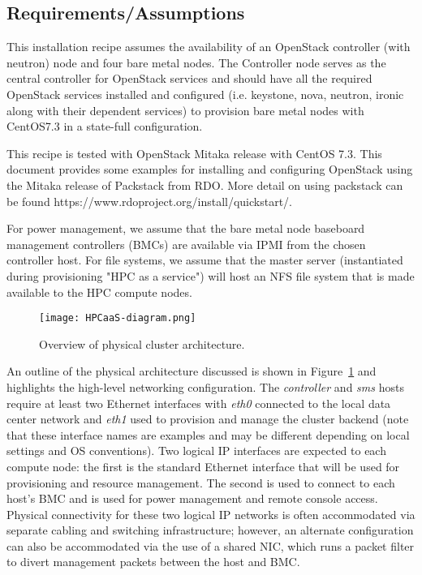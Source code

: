 \subsection{Requirements/Assumptions}

This installation recipe assumes the availability of an OpenStack controller (with neutron) node and four bare metal nodes. The Controller node serves as the central controller for OpenStack services and should have all the required OpenStack services installed and configured (i.e. keystone, nova, neutron, ironic along with their dependent services) to provision bare metal nodes with CentOS7.3 in a state-full 
configuration. 

This recipe is tested with OpenStack Mitaka release with CentOS 7.3. This 
document provides some examples for installing and configuring OpenStack using the Mitaka release of Packstack from RDO. More detail on using packstack can be found https://www.rdoproject.org/install/quickstart/. 

For power management, we assume that the bare metal node baseboard management controllers (BMCs) are available via IPMI from the chosen controller host. For file systems, we assume that the master server (instantiated during provisioning "HPC as a service") will host an NFS file system that is made available to the HPC compute nodes.



\begin{figure}[hbt]
\center
\texttt{[image: HPCaaS-diagram.png]}
\vspace*{-0.2cm}
\caption{Overview of physical cluster architecture.} \label{fig:physical_arch}
\end{figure}
\mbox{}

\vspace*{0.5cm}

An outline of the physical architecture discussed is shown in
Figure~\ref{fig:physical_arch} and highlights the high-level networking
configuration. The {\em controller} and {\em sms} hosts require at least two Ethernet interfaces with {\em eth0} connected to the local data center network and {\em eth1} used to provision and manage the cluster backend (note that these interface names are examples and may be different depending on local settings and OS conventions). Two logical IP interfaces are expected to each compute node: the first is the standard Ethernet interface that will be used for provisioning and resource management. The second is used to connect to each host's BMC and is used for power management and remote console access. Physical connectivity for these two logical IP networks is often accommodated via separate cabling and switching infrastructure; however, an alternate configuration can also be accommodated via the use of a shared NIC, which runs a packet filter to divert management packets between the host and BMC.

